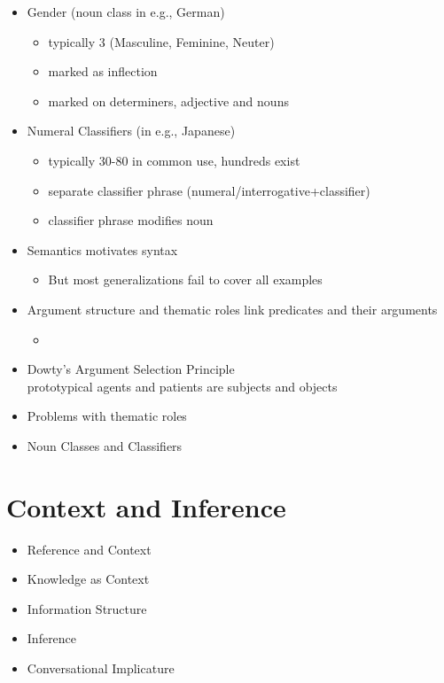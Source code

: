 \documentclass[headrule,footrule]{foils}
\begin{document}
\begin{itemize}
\item Gender (noun class in e.g., German)
  \begin{itemize}
  \item typically 3 (Masculine, Feminine, Neuter)
  \item marked as inflection
  \item marked on determiners, adjective and nouns
  \end{itemize}
\item Numeral Classifiers (in e.g., Japanese)
  \begin{itemize}
  \item typically 30-80 in common use, hundreds exist
  \item separate classifier phrase (numeral/interrogative+classifier)
  \item classifier phrase modifies noun
  \end{itemize}
\end{itemize}

\MyLogo{}
\begin{itemize}
\item  Semantics motivates syntax
  \begin{itemize}
  \item  But most generalizations fail to cover all examples
  \end{itemize}
\item Argument structure and thematic roles link predicates and their arguments
  \begin{itemize}
  \item {}
  \end{itemize}
\item Dowty's Argument Selection Principle
  \\ prototypical agents and patients are subjects and objects 
\item Problems with thematic roles
\item Noun Classes and Classifiers
\end{itemize}

\section{Context and Inference}

\begin{itemize}%
\item Reference and Context
\item Knowledge as Context
\item Information Structure
\item Inference
\item Conversational Implicature
\end{itemize}
\end{document}
